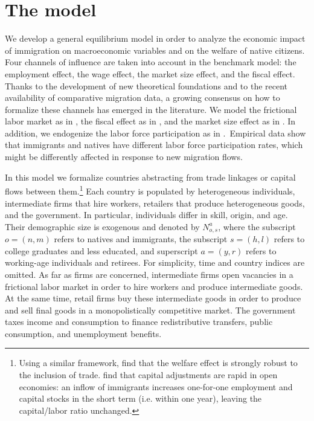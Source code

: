 \documentclass[a4paper,12pt]{article}
\begin{document}
\section{The model} \label{model}
We develop a general equilibrium model in order to analyze the economic impact of immigration on macroeconomic variables and on the welfare of native citizens. Four channels of influence are taken into account in the benchmark model: the employment effect, the wage effect, the market size effect, and the fiscal effect. Thanks to the development of new theoretical foundations and to the recent availability of comparative migration data, a growing consensus on how to formalize these channels has emerged in the literature. We model the frictional labor market as in \citet{Battisti2018}, the fiscal effect as in \citet{Storesletten2000}, and the market size effect as in \citet{Krugman1980}. In addition, we endogenize the labor force participation as in \citet{Burzynski2018}.\ Empirical data show that immigrants and natives have different labor force participation rates, which might be differently affected in response to new migration flows.

In this model we formalize countries abstracting from trade linkages or capital flows between them.\footnote{Using a similar framework, \citet{Aubry2016} find that the welfare effect is strongly robust to the inclusion of trade. \citet{Ortega2014} find that capital adjustments are rapid in open economies: an inflow of immigrants increases one-for-one employment and capital stocks in the short
term (i.e. within one year), leaving the capital/labor ratio unchanged.} Each country is populated by heterogeneous individuals, intermediate firms that hire workers, retailers that produce heterogeneous goods, and the government. In particular, individuals differ in skill, origin, and age. Their demographic size is exogenous and denoted by $N_{o,s}^{a}$, where the subscript $o=(n,m)$ refers to natives and immigrants, the subscript $s=(h,l)$ refers to college graduates and less educated, and superscript $a=(y,r)$ refers to working-age individuals and retirees. For simplicity, time and country indices are omitted. As far as firms are concerned, intermediate firms open vacancies in a frictional labor market in order to hire workers and produce intermediate goods. At the same time, retail firms buy these intermediate goods in order to produce and sell final goods in a monopolistically competitive market. The government taxes income and consumption to finance redistributive transfers, public consumption, and
unemployment benefits.
\end{document}
